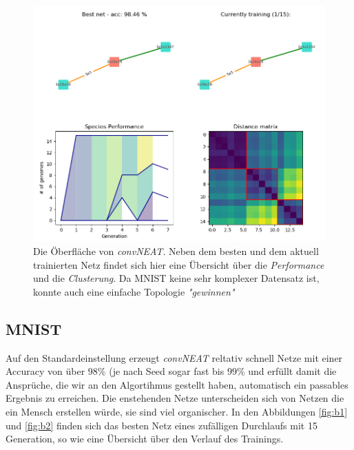 \documentclass[]{scrartcl}
\begin{document}
		\begin{figure}[h]
			\centering
			\includegraphics[scale=0.6]{img/dashboard.png}
			\caption{Die Öberfläche von \textit{convNEAT}. Neben dem besten und dem aktuell trainierten Netz findet
				sich hier eine Übersicht über die \textit{Performance} und die \textit{Clusterung}.
				Da MNIST keine sehr komplexer Datensatz ist, konnte auch eine einfache Topologie \textit{"gewinnen"}}
			\label{fig:gui}
		\end{figure}

		\clearpage

		\subsection{MNIST}
			
			Auf den Standardeinstellung erzeugt \textit{convNEAT} reltativ schnell Netze mit einer Accuracy von über $98 \%$ (je nach Seed sogar fast bis $99 \%$
			 und erfüllt damit die Ansprüche, die wir an den Algortihmus gestellt haben, automatisch ein passables Ergebnis zu erreichen.
			Die enstehenden Netze unterscheiden sich von Netzen die ein Mensch erstellen würde, sie sind viel organischer.
			In den Abbildungen \ref{fig:b1} und \ref{fig:b2} finden sich das besten Netz eines zufälligen Durchlaufs mit 15 Generation, so wie eine Übersicht über den Verlauf des Trainings.
\end{document}
